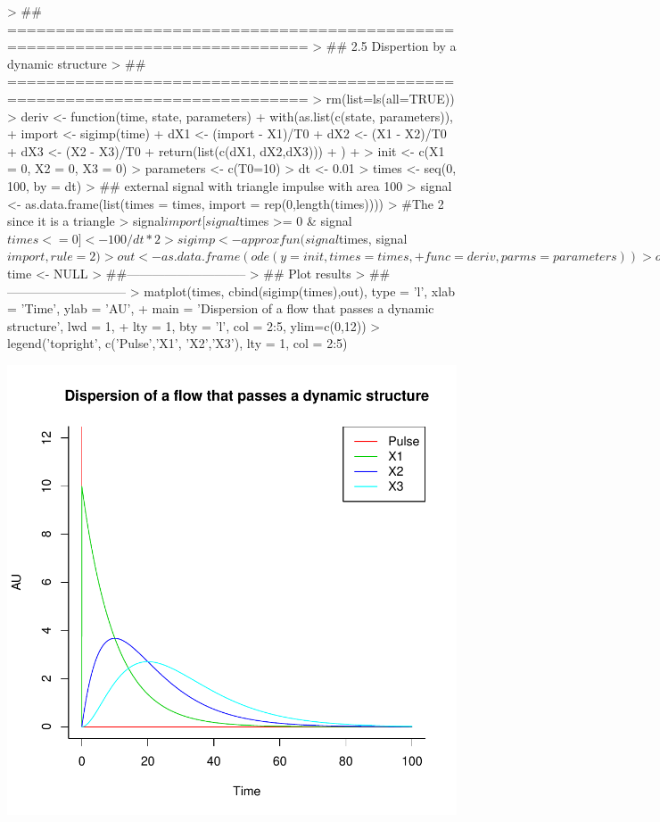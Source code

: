 \documentclass{article}
\begin{document}
\begin{Schunk}
\begin{Sinput}
> ## =============================================================================
> ## 2.5 Dispertion by a dynamic structure
> ## =============================================================================
> rm(list=ls(all=TRUE)) 
> deriv <- function(time, state, parameters) {
+   with(as.list(c(state, parameters)), {
+     import <- sigimp(time)
+     dX1 <- (import - X1)/T0
+     dX2 <- (X1 - X2)/T0
+     dX3 <- (X2 - X3)/T0 
+     return(list(c(dX1, dX2,dX3)))
+   })
+ }
> init <- c(X1 = 0, X2 = 0, X3 = 0)
> parameters <- c(T0=10)
> dt <- 0.01
> times <- seq(0, 100, by = dt)
> ## external signal with triangle impulse with area 100
> signal <- as.data.frame(list(times = times, import = rep(0,length(times))))
> #The 2 since it is a triangle
> signal$import[signal$times >= 0 & signal$times <= 0] <- 100 / dt * 2
> sigimp <- approxfun(signal$times, signal$import, rule = 2)
> out <- as.data.frame(ode(y = init, times = times, 
+                          func = deriv, parms = parameters))
> out$time <- NULL
> ##-----------------------------
> ## Plot results
> ##-----------------------------
> matplot(times, cbind(sigimp(times),out), type = 'l', xlab = 'Time', ylab = 'AU',
+         main = 'Dispersion of a flow that passes a dynamic structure', lwd = 1, 
+         lty = 1, bty = 'l', col = 2:5, ylim=c(0,12))
> legend('topright', c('Pulse','X1', 'X2','X3'), lty = 1, col = 2:5)
\end{Sinput}
\end{Schunk}
\includegraphics{L1-006}
\end{document}
